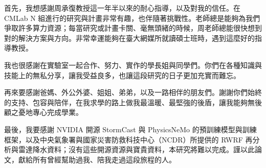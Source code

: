 
\begin{acknowledgement}

首先，我想感謝周承復教授這一年半以來的耐心指導，以及對我的信任。在 CMLab N 組進行的研究與計畫非常有趣，也伴隨著挑戰性。老師總是能夠為我們爭取許多算力資源；每當研究或計畫卡關、毫無頭緒的時候，周老師總能很快想到對的解決方案與方向。非常幸運能夠在臺大網媒所就讀碩士班時，遇到這麼好的指導教授。

我也很感謝在實驗室一起合作、努力、實作的學長姐與同學們。你們在各種知識與技能上的無私分享，讓我受益良多，也讓這段研究的日子更加充實而難忘。

再來要感謝爸媽、外公外婆、姐姐、弟弟，以及一路相伴的朋友們。謝謝你們始終的支持、包容與陪伴，在我求學的路上做我最溫暖、最堅強的後盾，讓我能夠無後顧之憂地專心完成學業。

最後，我要感謝 NVIDIA 開源 StormCast 與 PhysicsNeMo 的預訓練模型與訓練框架，以及中央氣象署與國家災害防救科技中心（NCDR）所提供的 RWRF 再分析與雷達降水資料；沒有這些開源資源與寶貴資料，本研究將難以完成。謹以此論文，獻給所有曾經幫助過我、陪我走過這段旅程的人。

\end{acknowledgement}
